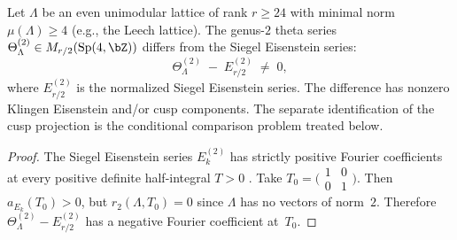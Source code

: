 \begin{proposition}%
\label{prop:leech-cusp-nonvanishing}%
%
Let $\Lambda$ be an even unimodular lattice of rank $r \geq 24$
with minimal norm~$\mu(\Lambda) \geq 4$
\textup{(}e.g., the Leech lattice\textup{)}.
The genus-$2$ theta series
$\Theta_\Lambda^{(2)} \in M_{r/2}(\mathrm{Sp}(4,\bZ))$
differs from the Siegel Eisenstein series:
\begin{equation}\label{eq:leech-cusp-nonvanishing}
\Theta_\Lambda^{(2)} \;-\; E_{r/2}^{(2)}
\;\neq\; 0,
\end{equation}
where $E_{r/2}^{(2)}$ is the normalized Siegel Eisenstein series.
The difference has nonzero Klingen Eisenstein and/or cusp
components. The separate identification of the cusp projection is the
conditional comparison problem treated below.
\end{proposition}

\begin{proof}
The Siegel Eisenstein series $E_k^{(2)}$ has strictly positive
Fourier coefficients at every positive definite half-integral
$T > 0$ \cite{Kitaoka93}. Take
$T_0 = \bigl(\begin{smallmatrix} 1 & 0 \\ 0 & 1 \end{smallmatrix}\bigr)$.
Then $a_{E_k}(T_0) > 0$, but
$r_2(\Lambda, T_0) = 0$ since $\Lambda$ has no vectors of norm~$2$.
Therefore
$\Theta_\Lambda^{(2)} - E_{r/2}^{(2)}$ has a negative Fourier
coefficient at~$T_0$.
\end{proof}

